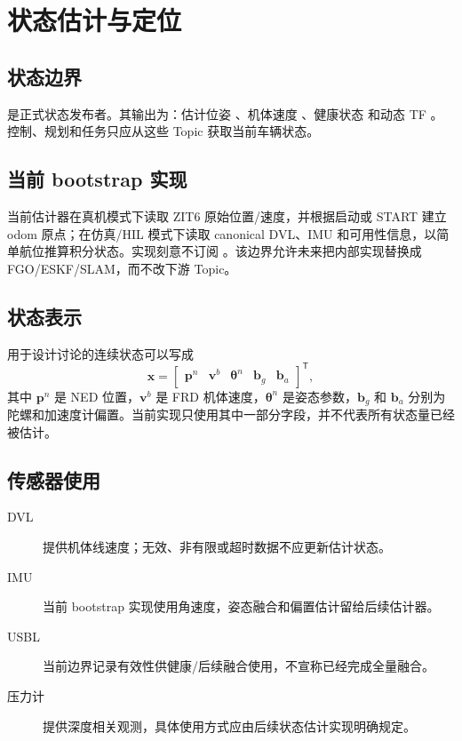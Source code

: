 \chapter{状态估计与定位}
\label{ch:localization}

\section{状态边界}
 是正式状态发布者。其输出为：估计位姿 、机体速度 、健康状态  和动态 TF 。控制、规划和任务只应从这些 Topic 获取当前车辆状态。

\section{当前 bootstrap 实现}
当前估计器在真机模式下读取 ZIT6 原始位置/速度，并根据启动或 START 建立 odom 原点；在仿真/HIL 模式下读取 canonical DVL、IMU 和可用性信息，以简单航位推算积分状态。实现刻意不订阅 。该边界允许未来把内部实现替换成 FGO/ESKF/SLAM，而不改下游 Topic。

\section{状态表示}
用于设计讨论的连续状态可以写成
\begin{equation}
  \mathbf{x} = \begin{bmatrix}
    \mathbf{p}^{n} & \mathbf{v}^{b} & \boldsymbol{\theta}^{n} &
    \mathbf{b}_{g} & \mathbf{b}_{a}
  \end{bmatrix}^{\mathsf T},
\end{equation}
其中 $\mathbf{p}^{n}$ 是 NED 位置，$\mathbf{v}^{b}$ 是 FRD 机体速度，$\boldsymbol{\theta}^{n}$ 是姿态参数，$\mathbf{b}_{g}$ 和 $\mathbf{b}_{a}$ 分别为陀螺和加速度计偏置。当前实现只使用其中一部分字段，并不代表所有状态量已经被估计。

\section{传感器使用}
\begin{description}
  \item[DVL] 提供机体线速度；无效、非有限或超时数据不应更新估计状态。
  \item[IMU] 当前 bootstrap 实现使用角速度，姿态融合和偏置估计留给后续估计器。
  \item[USBL] 当前边界记录有效性供健康/后续融合使用，不宣称已经完成全量融合。
  \item[压力计] 提供深度相关观测，具体使用方式应由后续状态估计实现明确规定。
\end{description}

